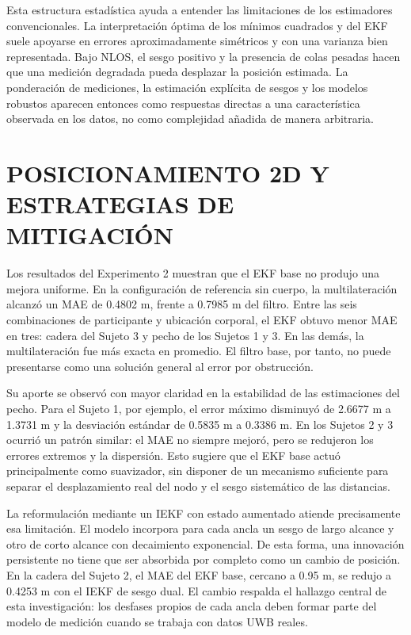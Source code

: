 Esta estructura estadística ayuda a entender las limitaciones de los estimadores convencionales. La interpretación óptima de los mínimos cuadrados y del EKF suele apoyarse en errores aproximadamente simétricos y con una varianza bien representada. Bajo NLOS, el sesgo positivo y la presencia de colas pesadas hacen que una medición degradada pueda desplazar la posición estimada. La ponderación de mediciones, la estimación explícita de sesgos y los modelos robustos aparecen entonces como respuestas directas a una característica observada en los datos, no como complejidad añadida de manera arbitraria.

\section{POSICIONAMIENTO 2D Y ESTRATEGIAS DE MITIGACIÓN}
\label{sec:discusion_posicionamiento}

Los resultados del Experimento 2 muestran que el EKF base no produjo una mejora uniforme. En la configuración de referencia sin cuerpo, la multilateración alcanzó un MAE de 0.4802 m, frente a 0.7985 m del filtro. Entre las seis combinaciones de participante y ubicación corporal, el EKF obtuvo menor MAE en tres: cadera del Sujeto 3 y pecho de los Sujetos 1 y 3. En las demás, la multilateración fue más exacta en promedio. El filtro base, por tanto, no puede presentarse como una solución general al error por obstrucción.

Su aporte se observó con mayor claridad en la estabilidad de las estimaciones del pecho. Para el Sujeto 1, por ejemplo, el error máximo disminuyó de 2.6677 m a 1.3731 m y la desviación estándar de 0.5835 m a 0.3386 m. En los Sujetos 2 y 3 ocurrió un patrón similar: el MAE no siempre mejoró, pero se redujeron los errores extremos y la dispersión. Esto sugiere que el EKF base actuó principalmente como suavizador, sin disponer de un mecanismo suficiente para separar el desplazamiento real del nodo y el sesgo sistemático de las distancias.

La reformulación mediante un IEKF con estado aumentado atiende precisamente esa limitación. El modelo incorpora para cada ancla un sesgo de largo alcance y otro de corto alcance con decaimiento exponencial. De esta forma, una innovación persistente no tiene que ser absorbida por completo como un cambio de posición. En la cadera del Sujeto 2, el MAE del EKF base, cercano a 0.95 m, se redujo a 0.4253 m con el IEKF de sesgo dual. El cambio respalda el hallazgo central de esta investigación: los desfases propios de cada ancla deben formar parte del modelo de medición cuando se trabaja con datos UWB reales.

